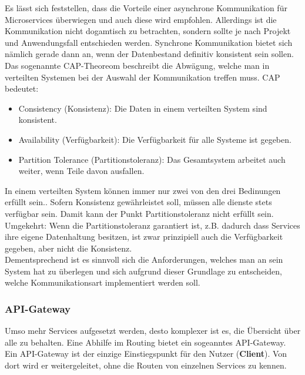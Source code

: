 Es lässt sich feststellen, dass die Vorteile einer asynchrone Kommunikation für Microservices überwiegen und auch diese wird empfohlen.\cite{wolff2018mic_praxis}\cite{bruce2019mic_in_action} Allerdings ist die Kommunikation nicht dogamtisch zu betrachten, sondern sollte je nach Projekt und Anwendungsfall entschieden werden. Synchrone Kommunikation bietet sich nämlich gerade dann an, wenn der Datenbestand definitiv konsistent sein sollen. \\

Das sogenannte CAP-Theoreom beschreibt die Abwägung, welche man in verteilten Systemen bei der Auswahl der Kommunikation treffen muss. CAP bedeutet:
	\begin{itemize}
		\item Consistency (Konsistenz): Die Daten in einem verteilten System sind konsistent.
		\item Availability (Verfügbarkeit): Die Verfügbarkeit für alle Systeme ist gegeben. 
		\item Partition Tolerance (Partitionstoleranz): Das Gesamtsystem arbeitet auch weiter, wenn Teile davon ausfallen. 
	\end{itemize}  

In einem verteilten System können immer nur zwei von den drei Bedinungen erfüllt sein.\cite{wolff2018mic_praxis}. Sofern Konsistenz gewährleistet soll, müssen alle dienste stets verfügbar sein. Damit kann der Punkt Partitionstoleranz nicht erfüllt sein. Umgekehrt: Wenn die Partitionstoleranz garantiert ist, z.B. dadurch dass Services ihre eigene Datenhaltung besitzen, ist zwar prinzipiell auch die Verfügbarkeit gegeben, aber nicht die Konsistenz. \\

Dementsprechend ist es sinnvoll sich die Anforderungen, welches man an sein System hat zu überlegen und sich aufgrund dieser Grundlage zu entscheiden, welche Kommunikationsart implementiert werden soll. 

\subsubsection{API-Gateway}

Umso mehr Services aufgesetzt werden, desto komplexer ist es, die Übersicht über alle zu behalten. Eine Abhilfe im Routing bietet ein sogeanntes API-Gateway. Ein API-Gateway ist der einzige Einstiegspunkt für den Nutzer (\textbf{Client}). Von dort wird er weitergeleitet, ohne die Routen von einzelnen Services zu kennen. 

